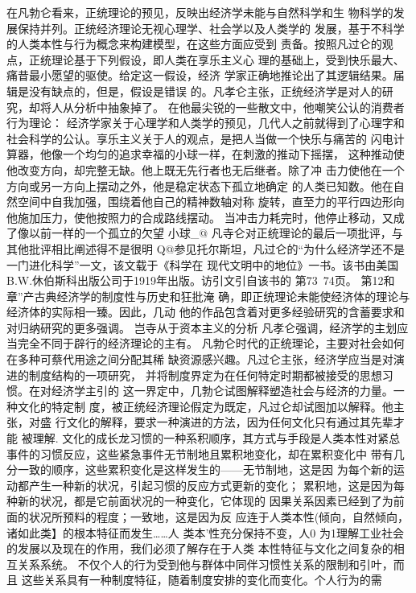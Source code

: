 在凡勃仑看来，正统理论的预见，反映出经济学未能与自然科学和生
物科学的发展保持并列。正统经济理论无视心理学、社会学以及人类学的
发展，基于不科学的人类本性与行为概念来构建模型，在这些方面应受到
责备。按照凡过仑的观点，正统理论基于下列假设，即人类在享乐主义心
理的基础上，受到快乐最大、痛昔最小愿望的驱使。给定这一假设，经济
学家正确地推论出了其逻辑结果。届辑是没有缺点的，但是，假设是错误
的。凡孝仑主张，正统经济学是对人的研究，却将人从分析中抽象掉了。
在他最尖锐的一些散文中，他嘲笑公认的消费者行为理论：
经济学家关于心理学和人类学的预见，几代人之前就得到了心理字和
社会科学的公认。享乐主义关于人的观点，是把人当做一个快乐与痛苦的
闪电计算器，他像一个均匀的追求幸福的小球一样，在刺激的推动下摇摆，
这种推动使他改变方向，却完整无缺。他上既无先行者也无后继者。除了冲
击力使他在一个方向或另一方向上摆动之外，他是稳定状态下孤立地确定
的人类已知数。他在自然空间中自我加强，围绕着他自己的精神数轴对称
旋转，直至力的平行四边形向他施加压力，使他按照力的合成路线摆动。
当冲击力耗完时，他停止移动，又成了像以前一样的一个孤立的欠望
小球_@
凡寺仑对正统理论的最后一项批评，与其他批评相比阐述得不是很明
Q@参见托尔斯坦，凡过仑的“为什么经济学还不是一门进化科学”一文，该文载于《科学在
现代文明中的地位》一书。该书由美国B.W.休伯斯科出版公司于1919年出版。访引文引自该书的
第73~74页。
第12和章”产古典经济学的制度性与历史和狂批淹
确，即正统理论未能使经济体的理论与经济体的实际相一臻。因此，几动
他的作品包含着对更多经验研究的含蓄要求和对归纳研究的更多强调。
岂寺从于资本主义的分析
凡孝仑强调，经济学的主划应当完全不同于辟行的经济理论的主有。
凡勃仑时代的正统理论，主要对社会如何在多种可蔡代用途之间分配其稀
缺资源感兴趣。凡过仑主张，经济学应当是对演进的制度结构的一项研究，
并将制度界定为在任何特定时期都被接受的思想习惯。在对经济学主引的
这一界定中，几勃仑试图解释塑造社会与经济的力量。一种文化的特定制
度，被正统经济理论假定为既定，凡过仑却试图加以解释。他主张，对盛
行文化的解释，要求一种演进的方法，因为任何文化只有通过其先辈才能
被理解.
文化的成长龙习惯的一种系积顺序，其方式与手段是人类本性对紧总
事件的习惯反应，这些紧急事件无节制地且累积地变化，却在累积变化中
带有几分一致的顺序，这些累积变化是这样发生的——无节制地，这是因
为每个新的运动都产生一种新的状况，引起习惯的反应方式更新的变化；
累积地，这是因为每种新的状况，都是它前面状况的一种变化，它体现的
因果关系因素已经到了为前面的状况所预料的程度；一致地，这是因为反
应连于人类本性(倾向，自然倾向，诸如此类】的根本特征而发生……人
类本'性充分保持不变，人0
为1理解工业社会的发展以及现在的作用，我们必须了解存在于人类
本性特征与文化之间复杂的相互关系系统。
不仅个人的行为受到他与群体中同伴习惯性关系的限制和引叶，而且
这些关系具有一种制度特征，随着制度安排的变化而变化。个人行为的需
